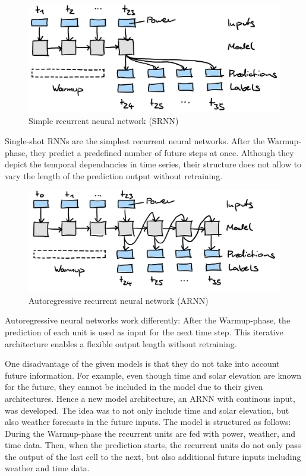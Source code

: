 \documentclass[11pt,table]{article}
\begin{document}
\begin{figure}[H]
	\centering
	\includegraphics[scale=1]{Figures/SRNN.png}
	\caption{Simple recurrent neural network (SRNN)}
	\label{fig:SRNN}
\end{figure}
Single-shot RNNs are the simplest recurrent neural networks. After the Warmup-phase, they predict a predefined number of future steps at once. Although they depict the temporal dependancies in time series, their structure does not allow to vary the length of the prediction output without retraining.
\begin{figure}[H]
	\centering
	\includegraphics[scale=1]{Figures/ARNN.png}
	\caption{Autoregressive recurrent neural network (ARNN)}
	\label{fig:ARNN}
\end{figure}
Autoregressive neural networks work differently: 
After the Warmup-phase, the prediction of each unit is used as input for the next time step. 
This iterative architecture enables a flexible output length without retraining.

One disadvantage of the given models is that they do not take into account future information. For example, even though time and solar elevation are known for the future, they cannot be included in the model due to their given architectures.
Hence a new model architecture, an ARNN with continous input, was developed. 
The idea was to not only include time and solar elevation, but also weather forecasts in the future inputs. The model is structured as follows: 
During the Warmup-phase the recurrent units are fed with power, weather, and time data. Then, when the prediction starts, the recurrent units do not only pass the output of the last cell to the next, but also additional future inputs including weather and time data.
 
\end{document}
